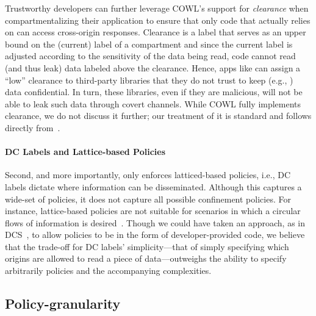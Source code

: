 Trustworthy developers can further leverage COWL's support for
\emph{clearance} when compartmentalizing their application to ensure
that only code that actually relies on \lcors{} can access
cross-origin responses.
%
Clearance is a label that serves as an upper bound on the (current)
label of a compartment and since the current label is adjusted
according to the sensitivity of the data being read, code cannot read
(and thus leak) data labeled above the clearance.
%
Hence, apps like  can assign a ``low'' clearance to
third-party libraries that they do not trust to keep (e.g.,
) data confidential.
%
In turn, these libraries, even if they are malicious, will not be able
to leak such data through covert channels.
%
While COWL fully implements clearance, we do not discuss it further;
our treatment of it is standard and follows directly
from~\cite{efstathopoulos:asbestos, Zeldovich:2006,
stefan:2011:flexible, Breeze13}.


%



\paragraph{DC Labels and Lattice-based Policies}
\label{sec:discussion:lattice}
 
Second, and more importantly, \sys{} only enforces latticed-based
policies, i.e., DC labels dictate where information can be
disseminated.
%
Although this captures a wide-set of policies, it does not capture all
possible confinement policies.
%
For instance, lattice-based policies are not suitable for scenarios in
which a circular flows of information is desired~\cite{Badger:1995}.
%
Though we could have taken an approach, as in DCS~\cite{Akhawe2013},
to allow policies to be in the form of developer-provided code, we
believe that the trade-off for DC labels' simplicity---that of simply
specifying which origins are allowed to read a piece of
data---outweighs the ability to specify arbitrarily policies and the
accompanying complexities.



\subsection{Policy-granularity}
\label{sec:discussion:granularity}


